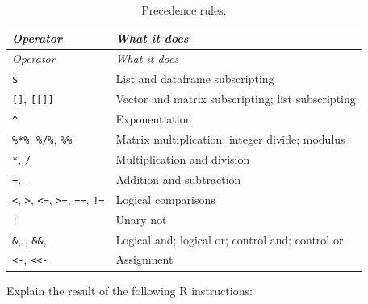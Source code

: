 \documentclass[
]{book}
\begin{document}
\begin{longtable}[]{@{}
  >{\raggedright\arraybackslash}p{}
  >{\raggedright\arraybackslash}p{}@{}}
\caption{\label{tab:Precedence} Precedence rules.}\tabularnewline
\toprule\noalign{}
\begin{minipage}[b]{\linewidth}\raggedright
\emph{{Operator}}
\end{minipage} & \begin{minipage}[b]{\linewidth}\raggedright
\emph{{What it does}}
\end{minipage} \\
\midrule\noalign{}
\endfirsthead
\toprule\noalign{}
\begin{minipage}[b]{\linewidth}\raggedright
\emph{{Operator}}
\end{minipage} & \begin{minipage}[b]{\linewidth}\raggedright
\emph{{What it does}}
\end{minipage} \\
\midrule\noalign{}
\endhead
\bottomrule\noalign{}
\endlastfoot
\texttt{\$} & List and dataframe subscripting \\
\texttt{{[}{]}}, \texttt{{[}{[}{]}{]}} & Vector and matrix subscripting; list subscripting \\
\texttt{\^{}} & Exponentiation \\
\texttt{\%*\%}, \texttt{\%/\%}, \texttt{\%\%} & Matrix multiplication; integer divide; modulus \\
\texttt{*}, \texttt{/} & Multiplication and division \\
\texttt{+}, \texttt{-} & Addition and subtraction \\
\texttt{\textless{}}, \texttt{\textgreater{}}, \texttt{\textless{}=}, \texttt{\textgreater{}=}, \texttt{==}, \texttt{!=} & Logical comparisons \\
\texttt{!} & Unary not \\
\texttt{\&}, \texttt{\textbar{}}, \texttt{\&\&}, \texttt{\textbar{}\textbar{}} & Logical and; logical or; control and; control or \\
\texttt{\textless{}-}, \texttt{\textless{}\textless{}-} & Assignment \\
\end{longtable}

Explain the result of the following R instructions:
\end{document}
